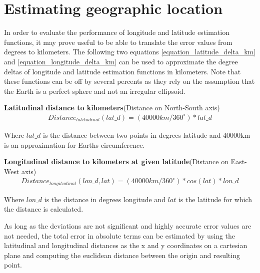 \chapter{Estimating geographic location}
\label{chapter_est_geoloc}
In order to evaluate the performance of longitude and latitude estimation functions, it may prove useful to be able to translate the error values from degrees to kilometers. The following two equations \ref{equation_latitude_delta_km} and \ref{equation_longitude_delta_km} can be used to approximate the degree deltas of longitude and latitude estimation functions in kilometers. Note that these functions can be off by several percents as they rely on the assumption that the Earth is a perfect sphere and not an irregular ellipsoid.


\hfill \break
\noindent\textbf{Latitudinal distance to kilometers}(Distance on North-South axis)
%
\begin{equation}
\begin{split}
\label{equation_latitude_delta_km}
Distance_{latitudinal}(lat\_d)=(40 000km/360^\circ)* lat\_d
\end{split}
\end{equation}

\noindent Where $lat\_d$ is the distance between two points in degrees latitude and 40000km is an approximation for Earths circumference.

\vspace{5mm} %

\noindent\textbf{Longitudinal distance to kilometers at given latitude}(Distance on East-West axis)
%
\begin{equation}
\begin{split}
\label{equation_longitude_delta_km}
Distance_{longitudinal}(lon\_d, lat)=(40 000km/360^\circ)* cos(lat)*lon\_d
\end{split}
\end{equation}

\noindent Where $lon\_d$ is the distance in degrees longitude and $lat$ is the latitude for which the distance is calculated.



\vspace{5mm} %

\noindent As long as the deviations are not significant and highly accurate error values are not needed, the total error in absolute terms can be estimated by using the latitudinal and longitudinal distances as the x and y coordinates on a cartesian plane and computing the euclidean distance between the origin and resulting point.

